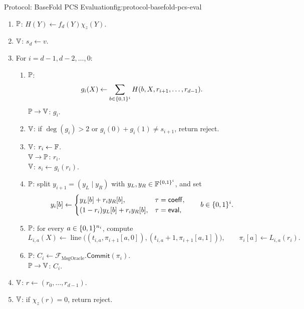 \begin{protocolbox}{Protocol: BaseFold PCS Evaluation}{fig:protocol-basefold-pcs-eval}
\begin{description}[leftmargin=0.2in,style=nextline,itemsep=0.16em,topsep=0.2em,parsep=0pt]
\begin{enumerate}[leftmargin=0.28in,label=\textbf{O\arabic*.},itemsep=0.08em,topsep=0.1em,parsep=0pt]
          \item \(\mathbb{P}\): \(H(Y)\gets f_d(Y)\chi_z(Y)\).
          \item \(\mathbb{V}\): \(s_d\gets v\).
          \item For $i=d-1,d-2,\ldots,0$:
            \begin{enumerate}[leftmargin=0.24in,label=\textbf{\alph*.},itemsep=0.06em,topsep=0.06em,parsep=0pt]
              \item \(\mathbb{P}\):
                \[
                  g_i(X)\gets
                  \sum_{b\in\{0,1\}^i}H(b,X,r_{i+1},\ldots,r_{d-1}).
                \]
                \(\mathbb{P}\to\mathbb{V}\): \(g_i\).
              \item \(\mathbb{V}\): if \(\deg(g_i)>2\) or
                \(g_i(0)+g_i(1)\ne s_{i+1}\), return reject.
              \item \(\mathbb{V}\): \(r_i\leftarrow\mathbb{F}\).\\
                \(\mathbb{V}\to\mathbb{P}\): \(r_i\).\\
                \(\mathbb{V}\): \(s_i\gets g_i(r_i)\).
              \item \(\mathbb{P}\): split \(y_{i+1}=(y_L\mid y_R)\) with
                \(y_L,y_R\in\mathbb{F}^{\{0,1\}^i}\), and set
                \[
                  y_i[b]\gets
                  \begin{cases}
                    y_L[b]+r_i y_R[b],
                      & \tau=\mathsf{coeff},\\
                    (1-r_i)y_L[b]+r_i y_R[b],
                      & \tau=\mathsf{eval},
                  \end{cases}
                  \qquad b\in\{0,1\}^i.
                \]
              \item \(\mathbb{P}\): for every \(a\in\{0,1\}^{n_i}\), compute
                \[
                  L_{i,a}(X)\gets
                  \operatorname{line}\bigl((t_{i,a},\pi_{i+1}[a,0]),
                  (t_{i,a}+1,\pi_{i+1}[a,1])\bigr),
                  \qquad
                  \pi_i[a]\gets L_{i,a}(r_i).
                \]
              \item \(\mathbb{P}\): \(C_i\gets\mathcal F_{\mathrm{MsgOracle}}.\mathsf{Commit}(\pi_i)\).\\
                \(\mathbb{P}\to\mathbb{V}\): \(C_i\).
            \end{enumerate}
          \item \(\mathbb{V}\): \(r\gets(r_0,\ldots,r_{d-1})\).
          \item \(\mathbb{V}\): if \(\chi_z(r)=0\), return reject.

\end{enumerate}
\end{description}
\end{protocolbox}
